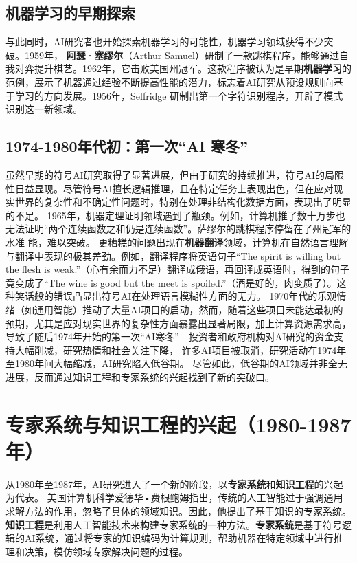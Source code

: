 \subsection{机器学习的早期探索}

与此同时，AI研究者也开始探索机器学习的可能性，机器学习领域获得不少突破。1959年， {\bf 阿瑟·塞缪尔}（Arthur Samuel）研制了一款跳棋程序，能够通过自我对弈提升棋艺。1962年，它击败美国州冠军。这款程序被认为是早期{\bf 机器学习}的范例，展示了机器通过经验不断提高性能的潜力，标志着AI研究从预设规则向基于学习的方向发展。1956年，Selfridge 研制出第一个字符识别程序，开辟了模式识别这一新领域。
\subsection*{1974-1980年代初：第一次“AI 寒冬”}
虽然早期的符号AI研究取得了显著进展，但由于研究的持续推进，符号AI的局限性日益显现。尽管符号AI擅长逻辑推理，且在特定任务上表现出色，但在应对现实世界的复杂性和不确定性问题时，特别在处理非结构化数据方面，表现出了明显的不足。
1965年，机器定理证明领域遇到了瓶颈。例如，计算机推了数十万步也无法证明“两个连续函数之和仍是连续函数”。萨缪尔的跳棋程序停留在了州冠军的水准
能，难以突破。
更糟糕的问题出现在{\bf 机器翻译}领域，计算机在自然语言理解与翻译中表现的极其差劲。例如，翻译程序将英语句子“The spirit is willing but the flesh is weak.”（心有余而力不足）翻译成俄语，再回译成英语时，得到的句子竟变成了“The wine is good but the meet is spoiled.”（酒是好的，肉变质了）。这种笑话般的错误凸显出符号AI在处理语言模糊性方面的无力。
1970年代的乐观情绪（如通用智能）推动了大量AI项目的启动，然而，随着这些项目未能达最初的预期，尤其是应对现实世界的复杂性方面暴露出显著局限，加上计算资源需求高，导致了随后1974年开始的第一次“AI寒冬”---投资者和政府机构对AI研究的资金支持大幅削减，研究热情和社会关注下降， 许多AI项目被取消，研究活动在1974年至1980年间大幅缩减，AI研究陷入低谷期。
尽管如此，低谷期的AI领域并非全无进展，反而通过知识工程和专家系统的兴起找到了新的突破口。
\section{专家系统与知识工程的兴起（1980-1987年）}

从1980年至1987年，AI研究进入了一个新的阶段，以{\bf 专家系统}和{\bf 知识工程}的兴起为代表。
美国计算机科学爱德华•费根鲍姆指出，传统的人工智能过于强调通用求解方法的作用，忽略了具体的领域知识。因此，他提出了基于知识的专家系统。
{\bf 知识工程}是利用人工智能技术来构建专家系统的一种方法。{\bf 专家系统}是基于符号逻辑的AI系统，通过将专家的知识编码为计算规则，帮助机器在特定领域中进行推理和决策，模仿领域专家解决问题的过程。
